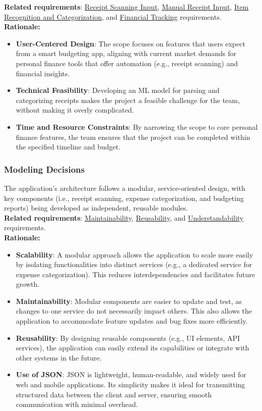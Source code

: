 \documentclass[12pt]{article}
\begin{document}
\noindent\textbf{Related requirements}: \hyperref[FR-IP]{Receipt Scanning
Input}, \hyperref[FR-MIS]{Manual Receipt Input}, \hyperref[FR-RS]{Item
Recognition and Categorization}, and \hyperref[FR-FT]{Financial Tracking}
requirements.\\

\noindent\textbf{Rationale:}
\begin{itemize}
    \item \textbf{User-Centered Design}: The scope focuses on features that
    users expect from a smart budgeting app, aligning with current market
    demands for personal finance tools that offer automation (e.g., receipt
    scanning) and financial insights. 
    \item \textbf{Technical Feasibility}: Developing an ML model for parsing and
    categorizing receipts makes the project a feasible challenge for the team,
    without making it overly complicated.
    \item \textbf{Time and Resource Constraints}: By narrowing the scope to core
    personal finance features, the team ensures that the project can be
    completed within the specified timeline and budget.
\end{itemize}

\subsubsection{Modeling Decisions}
The application's architecture follows a modular, service-oriented design, with
key components (i.e., receipt scanning, expense categorization, and budgeting
reports) being developed as independent, reusable modules.\\

\noindent\textbf{Related requirements}: \hyperref[NFR-MTB]{Maintainability},
\hyperref[NFR-REUS]{Reusability}, and \hyperref[NFR-UND]{Understandability}
requirements.\\

\noindent\textbf{Rationale:}
\begin{itemize}
    \item \textbf{Scalability}: A modular approach allows the application to scale more easily by isolating functionalities into distinct services (e.g., a dedicated service for expense categorization). This reduces interdependencies and facilitates future growth.
    \item \textbf{Maintainability}: Modular components are easier to update and test, as changes to one service do not necessarily impact others. This also allows the application to accommodate feature updates and bug fixes more efficiently.
    \item \textbf{Reusability}: By designing reusable components (e.g., UI elements, API services), the application can easily extend its capabilities or integrate with other systems in the future.
    \item \textbf{Use of JSON}: JSON is lightweight, human-readable, and widely used for web and mobile applications. Its simplicity makes it ideal for transmitting structured data between the client and server, ensuring smooth communication with minimal overhead.
\end{itemize}
\end{document}
